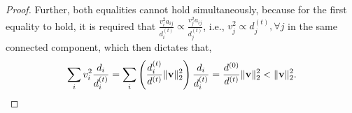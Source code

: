\begin{proof}
Further, both equalities cannot hold simultaneously, because for the first equality to hold, it is required that $\frac{v_i^2a_{ij}}{d_i^{(t)}} \propto \frac{v_j^2a_{ij}}{d_j^{(t)}}$, i.e., $v_j^2 \propto d_j^{(t)}, \forall j$ in the same connected component, which then dictates that,
\begin{align*}
	\sum_i v_i^2 \frac{d_i}{d^{(t)}_i} 
	= \sum_i \left( \frac{d_i^{(t)}}{d^{(t)}} \|\mathbf{v}\|_2^2\right) \frac{d_i}{d^{(t)}_i}
	= \frac{ d^{(0)} }{ d^{(t)} }\|\mathbf{v}\|_2^2 
	<\|\mathbf{v}\|_2^2.
\end{align*}
\end{proof}


%
%


